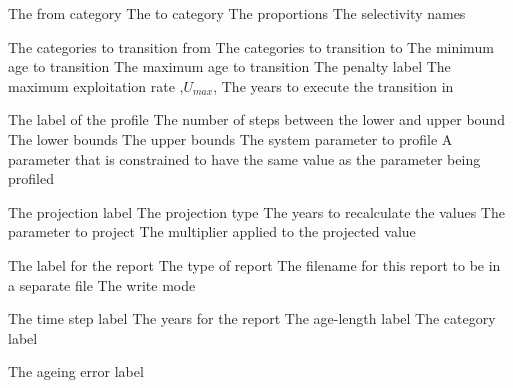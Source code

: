 \par\textbf{}\par
{} {The from category}
 {The to category}
 {The proportions}
 {The selectivity names}
\par\textbf{}\par
{} {The categories to transition from}
 {The categories to transition to}
 {The minimum age to transition}
 {The maximum age to transition}
 {The penalty label}
 {The maximum exploitation rate ,$U_{max}$,}
 {The years to execute the transition in}
\par\par
{} {The label of the profile}
 {The number of steps between the lower and upper bound}
 {The lower bounds}
 {The upper bounds}
 {The system parameter to profile}
 {A parameter that is constrained to have the same value as the parameter being profiled}
\par\par
{} {The projection label}
 {The projection type}
 {The years to recalculate the values}
 {The parameter to project}
 {The multiplier applied to the projected value}
\par\par
{} {The label for the report}
 {The type of report}
 {The filename for this report to be in a separate file}
 {The write mode}
\par\textbf{}\par
{} {The time step label}
 {The years for the report}
 {The age-length label}
 {The category label}
\par\textbf{}\par
{} {The ageing error label}
\par\textbf{}\par
